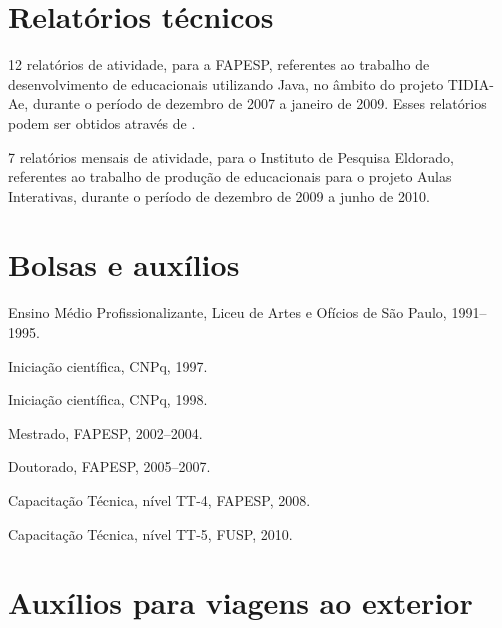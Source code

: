 \section*{Relatórios técnicos}

\begin{compactitem}
	\item 12 relatórios de atividade, para a FAPESP, referentes ao trabalho de desenvolvimento de  educacionais utilizando Java, no âmbito do projeto TIDIA-Ae, durante o período de dezembro de 2007 a janeiro de 2009. Esses relatórios podem ser obtidos através de \cite{irpagnossin-stoa}.
	\item 7 relatórios mensais de atividade, para o Instituto de Pesquisa Eldorado, referentes ao trabalho de produção de  educacionais para o projeto Aulas Interativas, durante o período de dezembro de 2009 a junho de 2010.
\end{compactitem}

\section*{Bolsas e auxílios}

\begin{compactitem}
	\item Ensino Médio Profissionalizante, Liceu de Artes e Ofícios de São Paulo, 1991--1995.
	\item Iniciação científica, CNPq, 1997.
	\item Iniciação científica, CNPq, 1998.
	\item Mestrado, FAPESP, 2002--2004.
	\item Doutorado, FAPESP, 2005--2007.
	\item Capacitação Técnica, nível TT-4, FAPESP, 2008.
	\item Capacitação Técnica, nível TT-5, FUSP, 2010.
\end{compactitem}

\section*{Auxílios para viagens ao exterior}

